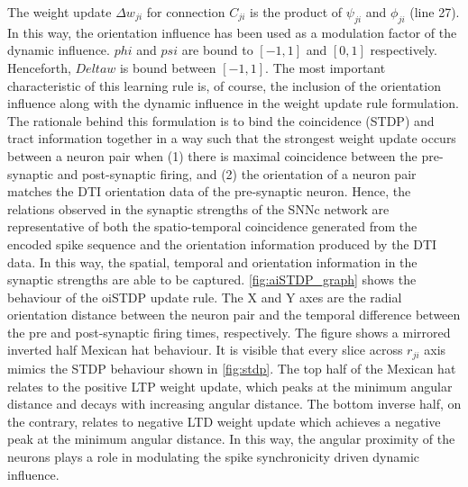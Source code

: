 \begin{enumerate}
	The weight update $\Delta w_{ji}$ for connection $C_{ji}$ is the product of $\psi_{ji}$ and $\phi_{ji}$ (line 27). In this way, the orientation influence has been used as a modulation factor of the dynamic influence. $phi$ and $psi$ are bound to $[-1, 1]$ and $[0, 1]$ respectively. Henceforth, $Delta w$ is bound between $[-1, 1]$. The most important characteristic of this learning rule is, of course, the inclusion of the orientation influence along with the dynamic influence in the weight update rule formulation. The rationale behind this formulation is to bind the coincidence (STDP) and tract information together in a way such that the strongest weight update occurs between a neuron pair when (1) there is maximal coincidence between the pre-synaptic and post-synaptic firing, and (2) the orientation of a neuron pair matches the DTI orientation data of the pre-synaptic neuron. Hence, the relations observed in the synaptic strengths of the SNNc network are representative of both the spatio-temporal coincidence generated from the encoded spike sequence and the orientation information produced by the DTI data. In this way, the spatial, temporal and orientation information in the synaptic strengths are able to be captured. \figurename \ref{fig:aiSTDP_graph} shows the behaviour of the oiSTDP update rule. The X and Y axes are the radial orientation distance between the neuron pair and the temporal difference between the pre and post-synaptic firing times, respectively. The figure shows a mirrored inverted half Mexican hat behaviour. It is visible that every slice across $r_{ji}$ axis mimics the STDP behaviour shown in \figurename \ref{fig:stdp}.  The top half of the Mexican hat relates to the positive LTP weight update, which peaks at the minimum angular distance and decays with increasing angular distance. The bottom inverse half, on the contrary, relates to negative LTD weight update which achieves a negative peak at the minimum angular distance. In this way, the angular proximity of the neurons plays a role in modulating the spike synchronicity driven dynamic influence.   	 
\end{enumerate}   
